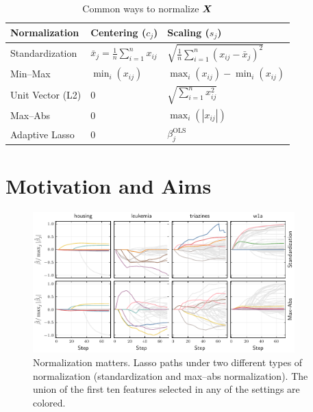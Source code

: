 \documentclass[aspectratio=1610,onlytextwidth]{beamer}
\begin{document}
\begin{frame}[c]
  \begin{table}[hbt]
    \centering
    \caption{Common ways to normalize \(\boldsymbol{X}\)}
    \begin{tabular}{lll}
      \toprule
      Normalization    & Centering (\(c_{j}\))                          & Scaling (\(s_j\))                                         \\
      \midrule
      Standardization  & \(\bar{x}_j = \frac{1}{n}\sum_{i=1}^n x_{ij}\) & \(\sqrt{\frac{1}{n}\sum_{i=1}^n (x_{ij} - \bar{x}_j)^2}\) \\
      \addlinespace
      Min--Max         & \(\min_i(x_{ij})\)                             & \(\max_i(x_{ij}) - \min_i(x_{ij})\)                       \\
      \addlinespace
      Unit Vector (L2) & 0                                              & \(\sqrt{\sum_{i=1}^n x_{ij}^2}\)                          \\
      \addlinespace
      Max--Abs         & 0                                              & \(\max_i(|x_{ij}|)\)                                      \\
      \addlinespace
      Adaptive Lasso   & 0                                              & \(\beta_j^\text{OLS}\)                                    \\
      \bottomrule
    \end{tabular}
  \end{table}
\end{frame}

\section{Motivation and Aims}

\begin{frame}[c]

  \begin{figure}[htpb]
    \centering
    \includegraphics[width=0.9\textwidth]{figures/paper6-realdata_paths.pdf}
    \caption{%
      Normalization matters. Lasso paths under two different types of normalization (standardization and max--abs normalization). The union of the first ten features selected in any of the settings are colored.
    }
  \end{figure}

\end{frame}
\end{document}
